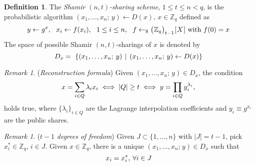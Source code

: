 \documentclass[10pt, psamsfonts, reqno]{amsart}
\theoremstyle{definition}
\newtheorem{defn}[thm]{Definition}
\theoremstyle{remark}
\newtheorem{rem}[thm]{Remark}
\numberwithin{equation}{section}
\begin{document}
\begin{defn}\label{shamir_definition}
The \textit{Shamir $(n, t)$-sharing scheme}, $1 \le t \le n < q$,
is the probabilistic algorithm
$(x_1, \dots, x_n;\hspace{2pt} y) \leftarrow D(x),
\hspace{2pt} x \in \mathbb{Z}_q$
defined as
\vspace{5pt}
\begin{equation*}
y \leftarrow g ^ x,
\ \ x_i \leftarrow f(x_i),
\ \ 1 \le i \le n,
\ \ f \leftarrow_\$ \big(
	\hspace{0.3pt}
	\mathbb{Z}_q
	\hspace{0.3pt}
	\big)_{t-1}
	\hspace{0.3pt}
	[
		\hspace{0.5pt}
		X
		\hspace{0.5pt}
	]
\textup{ with }
f(0) = x
\hspace{0pt}
\vspace{5pt}
\end{equation*}
The space of possible Shamir $(n,t)$-sharings of $x$
is denoted by
\vspace{5pt}
\begin{equation*}
D_x =\
\left\{(x_1, \dots, x_n;\hspace{2pt} y)
\hspace{4pt}
\middle\vert
\hspace{4pt}
(x_1, \dots, x_n;\hspace{2pt} y) \leftarrow D(x)
\right\}
\hspace{0pt}
\vspace{5pt}
\end{equation*}
\end{defn}

\begin{rem}\label{shamir_reconstruction}
(\textit{Reconstruction formula})
Given $(x_1, \dots, x_n;\hspace{2pt} y) \in D_x$,
the condition
\vspace{5pt}
\begin{equation}\label{shamir_threshold_condition}
x = \sum_{i \in Q} \lambda_i x_i
\iff
|Q| \ge t
\iff
y = \prod_{i \in Q} y_i^{\lambda_i},
\vspace{5pt}
\end{equation}
holds true,
where $\{\lambda_i\}_{i \in Q}$ are the
Lagrange interpolation coefficients
and $y_i\equiv g ^ {x_i}$
are the public shares.
\end{rem}

\begin{rem}\label{shamir_degrees_of_freedom}
(\textit{$t - 1$ degrees of freedom})
Given $J \subset \{1, \dots, n\}$ with $|J| = t - 1$,
pick $x^*_i \in \mathbb{Z}_q,\hspace{2pt} i \in J$.
Given $x \in \mathbb{Z}_q$, there is a unique
$(x_1, \dots, x_n;\hspace{1pt} y) \in D_x$
such that
\vspace{5pt}
\begin{equation*}
x_i = x^*_i,\hspace{2pt}\forall i \in J
\vspace{5pt}
\end{equation*}
\end{rem}
\end{document}

